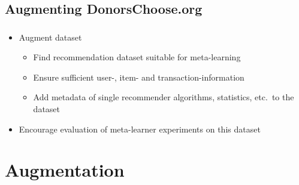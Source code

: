 \documentclass[aspectratio=169]{beamer}
\begin{document}
\subsection{Augmenting DonorsChoose.org}
\begin{frame}
	\frametitle{\insertsection}
	\framesubtitle{\insertsubsection}

	\begin{itemize}
		\item Augment dataset
		\begin{itemize}
			\item Find recommendation dataset suitable for meta-learning
			\item Ensure sufficient user-, item- and transaction-information
			\item Add metadata of single recommender algorithms, statistics, etc.~to the dataset
		\end{itemize}
		\item Encourage evaluation of meta-learner experiments on this dataset
	\end{itemize}

\end{frame}

\section[Methodology]{Augmentation}
\frame{\vfill\centering\tableofcontents[sectionstyle=show/shaded,subsectionstyle=show/hide]\vfill}
\end{document}
